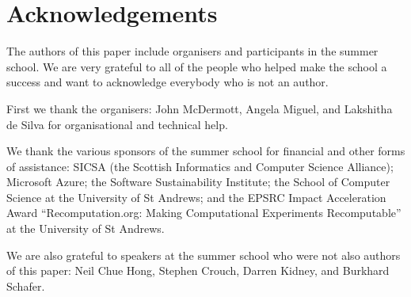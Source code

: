 \section*{Acknowledgements}
\label{s:ack}

The authors of this paper include organisers and participants in the
summer school. We are very grateful to all of the people who helped
make the school a success and want to acknowledge everybody who is not an
author.

First we thank the organisers: John McDermott, Angela Miguel, and Lakshitha de Silva for organisational and technical help.

We thank the various sponsors of the summer school for financial and
other forms of assistance:
SICSA (the Scottish Informatics and Computer Science Alliance); 
Microsoft Azure; the Software Sustainability Institute; 
the School of Computer Science at the University of St Andrews; 
and the EPSRC Impact Acceleration Award ``Recomputation.org: Making
Computational Experiments Recomputable''
at the University of St Andrews.

We are also grateful to speakers at the summer school who were not also authors of this paper: 
Neil Chue Hong,
Stephen Crouch, 
Darren Kidney, and
Burkhard Schafer.
